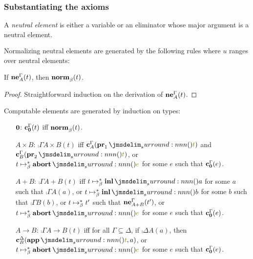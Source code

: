 \documentclass[a4paper]{article}
\begin{document}
\subsubsection{Substantiating the axioms}
\label{sec:0008}

\begin{definition}
  A \emph{neutral element} is either a variable or an eliminator whose major argument is a neutral element.
\end{definition}

\begin{construction}
  Normalizing neutral elements are generated by the following rules where $u$ ranges over neutral elements:
\end{construction}

\begin{lemma}\label{thm:0002}
  If $\operatorname{\mathbf{ne}}^{\Gamma}_{A}(t)$, then $\operatorname{\mathbf{norm}}^{}_{\beta}(t)$.
\end{lemma}
\begin{proof}
  Straightforward induction on the derivation of $\operatorname{\mathbf{ne}}^{\Gamma}_{A}(t)$.
\end{proof}

\begin{construction}
  Computable elements are generated by induction on types:
  \begin{itemize}
  \item[$\mathbf{0}$:] $\operatorname{\mathbf{c}}^{\Gamma}_{\mathbf{0}}(t)$ iff $\operatorname{\mathbf{norm}}^{}_{\beta}(t)$.
  \item[$A \times B$:] $\comp{\Gamma}{A \times B}(t)$ iff $\comp{\Gamma}{A}(\tmPrl{t})$ and $\comp{\Gamma}{B}(\tmPrr{t})$, or $t \bRed* \tmAbort{e}$ for some $e$ such that $\operatorname{\mathbf{c}}^{\Gamma}_{\mathbf{0}}(e)$.
  \item[$A + B$:] $\comp{\Gamma}{A + B}(t)$ iff $t \bRed* \tmInl{a}$ for some $a$ such that $\comp{\Gamma}{A}(a)$, or $t \bRed* \tmInl{b}$ for some $b$ such that $\comp{\Gamma}{B}(b)$, or $t \bRed* t'$ such that $\operatorname{\mathbf{ne}}^{\Gamma}_{A + B}(t')$, or $t \bRed* \tmAbort{e}$ for some $e$ such that $\operatorname{\mathbf{c}}^{\Gamma}_{\mathbf{0}}(e)$.
  \item[$A \to B$:] $\comp{\Gamma}{A \to B}(t)$ iff for all $\Gamma \subseteq \Delta$, if $\comp{\Delta}{A}(a)$, then $\comp{\Delta}{B}(\tmApp{t}{a})$, or $t \bRed* \tmAbort{e}$ for some $e$ such that $\operatorname{\mathbf{c}}^{\Gamma}_{\mathbf{0}}(e)$.
  \end{itemize}
\end{construction}
\end{document}
